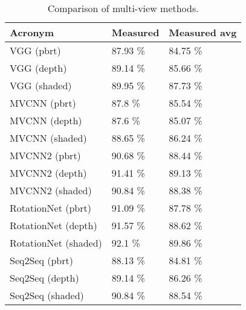 \begin{table}[]
	\begin{tabular}{lll}
		\hline
		\textbf{Acronym}    & Measured & Measured avg \\ \hline
		VGG (pbrt)           & 87.93 \% & 84.75 \%     \\
		VGG (depth)          & 89.14 \% & 85.66 \%     \\
		VGG (shaded)         & 89.95 \% & 87.73 \%     \\
		MVCNN (pbrt)        & 87.8 \%  & 85.54 \%     \\
		MVCNN (depth)       & 87.6 \%  & 85.07 \%     \\
		MVCNN (shaded)      & 88.65 \% & 86.24 \%     \\
		MVCNN2 (pbrt)       & 90.68 \% & 88.44 \%     \\
		MVCNN2 (depth)      & 91.41 \% & 89.13 \%     \\
		MVCNN2 (shaded)     & 90.84 \% & 88.38 \%     \\
		RotationNet (pbrt)   & 91.09 \%  & 87.78 \%     \\
		RotationNet (depth)  & 91.57 \%  & 88.62 \%     \\
		RotationNet (shaded) & 92.1 \%  & 89.86 \%     \\
		Seq2Seq  (pbrt)     & 88.13 \% & 84.81 \%     \\
		Seq2Seq  (depth)    & 89.14 \% & 86.26 \%     \\
		Seq2Seq  (shaded)   & 90.84 \% & 88.54 \%
	\end{tabular}
\caption{Comparison of multi-view methods.}
\label{Table:mv}
\end{table}